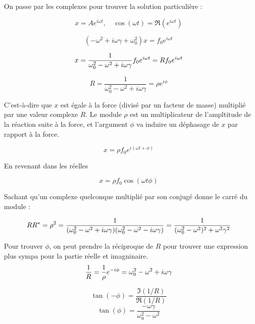 \documentclass{article}
\begin{document}
On passe par les complexes pour trouver la solution particulière :

\[ x = Ae^{i\omega t}, \quad \cos(\omega t) = \Re(e^{i \omega t}) \]



\[ (-\omega^2 + i \omega\gamma + \omega_0^2)x = f_0 e^{i \omega t} \]



\begin{dmath*}
x = \frac{1}{\omega_0^2 -\omega^2 + i \omega\gamma} f_0 e^{i\omega t} \\
= Rf_0 e^{i \omega t}
\end{dmath*}

\[ R = \frac{1}{\omega_0^2 -\omega^2 + i \omega\gamma} = \rho e^{i\phi} \]

C'est-à-dire que $x$ est égale à la force (divisé par un facteur de masse) multiplié par une valeur complexe $R$.
Le module $\rho$ est un multiplicateur de l'ampltitude de la réaction suite à la force, et l'argument $\phi$ va induire un déphasage de $x$ par rapport à la force.

\[ x  = \rho f_0 e^{i(\omega t + \phi)} \]

En revenant dans les réelles

\[ x  = \rho f_0 \cos(\omega t \phi)\]


Sachant qu'un complexe quelconque multiplié par son conjugé donne le carré du module :

\begin{dmath*}
    RR^* = \rho^2 \\
    = \frac{1}{(\omega_0^2 -\omega^2 + i \omega\gamma)(\omega_0^2 -\omega^2 - i \omega\gamma)}
    = \frac{1}{(\omega_0^2 - \omega^2)^2 + \omega^2\gamma^2}
\end{dmath*}

Pour trouver $\phi$, on peut prendre la réciproque de $R$ pour trouver une expression plus sympa pour la partie réelle et imagninaire.
\begin{dmath*}
    \frac{1}{R} = \frac{1}{\rho}e^{-i\phi} \\
    = \omega_0^2 -\omega^2 + i\omega\gamma
\end{dmath*}

\[ \tan(-\phi) = \frac{\Im(1/R)}{\Re(1/R)} \]
\[ \tan(\phi) = \frac{-\omega\gamma}{\omega_0^2 - \omega^2} \]

\end{document}
